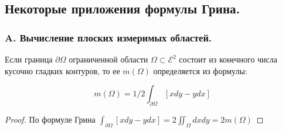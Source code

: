\subsection{Некоторые приложения формулы Грина.} 
\subsubsection*{A. Вычисление плоских измеримых областей.} 
\begin{sentence} Если граница $\partial \Omega$ ограниченной области $\Omega\subset \mathscr{E}^2$ состоит из конечного числа кусочно гладких контуров, то ее $m(\Omega)$ определяется из формулы:
\end{sentence}
\begin{equation*}
m(\Omega)=1/2\int_{\partial\Omega}\left[xdy-ydx\right]
\end{equation*} 
\begin{proof} По формуле Грина $\int_{\partial\Omega}\left[xdy-ydx\right]=2\iint_\Omega dxdy=2m(\Omega)$
\end{proof}
